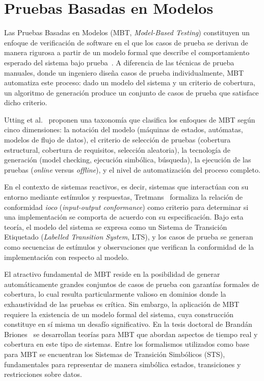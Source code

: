 \section{Pruebas Basadas en Modelos}
\label{sec:mbt}

Las Pruebas Basadas en Modelos (MBT, \textit{Model-Based Testing}) constituyen un enfoque de verificación de software en el que los casos de prueba se derivan de manera rigurosa a partir de un modelo formal que describe el comportamiento esperado del sistema bajo prueba~\cite{utting2012taxonomy}. A diferencia de las técnicas de prueba manuales, donde un ingeniero diseña casos de prueba individualmente, MBT automatiza este proceso: dado un modelo del sistema y un criterio de cobertura, un algoritmo de generación produce un conjunto de casos de prueba que satisface dicho criterio.

Utting et al.~\cite{utting2012taxonomy} proponen una taxonomía que clasifica los enfoques de MBT según cinco dimensiones: la notación del modelo (máquinas de estados, autómatas, modelos de flujo de datos), el criterio de selección de pruebas (cobertura estructural, cobertura de requisitos, selección aleatoria), la tecnología de generación (model checking, ejecución simbólica, búsqueda), la ejecución de las pruebas (\textit{online} versus \textit{offline}), y el nivel de automatización del proceso completo.

En el contexto de sistemas reactivos, es decir, sistemas que interactúan con su entorno mediante estímulos y respuestas, Tretmans~\cite{tretmans2008mbt} formaliza la relación de conformidad \textit{ioco} (\textit{input-output conformance}) como criterio para determinar si una implementación se comporta de acuerdo con su especificación. Bajo esta teoría, el modelo del sistema se expresa como un Sistema de Transición Etiquetado (\textit{Labelled Transition System}, LTS), y los casos de prueba se generan como secuencias de estímulos y observaciones que verifican la conformidad de la implementación con respecto al modelo.

El atractivo fundamental de MBT reside en la posibilidad de generar automáticamente grandes conjuntos de casos de prueba con garantías formales de cobertura, lo cual resulta particularmente valioso en dominios donde la exhaustividad de las pruebas es crítica. Sin embargo, la aplicación de MBT requiere la existencia de un modelo formal del sistema, cuya construcción constituye en sí misma un desafío significativo. En la tesis doctoral de Brandán Briones~\cite{brandan2007mbt} se desarrollan teorías para MBT que abordan aspectos de tiempo real y cobertura en este tipo de sistemas. Entre los formalismos utilizados como base para MBT se encuentran los Sistemas de Transición Simbólicos (STS), fundamentales para representar de manera simbólica estados, transiciones y restricciones sobre datos.

